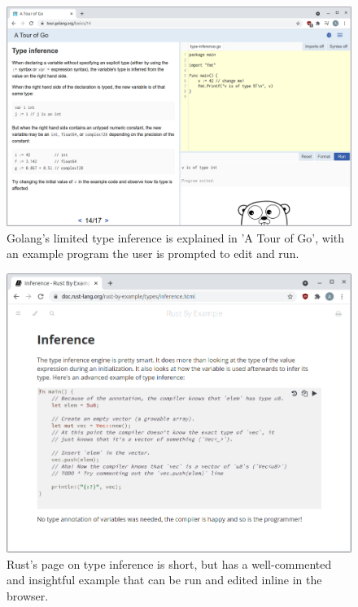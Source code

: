 \documentclass[a4paper,fleqn,oneside,12pt]{report}
\begin{document}
\begin{figure}[h!]
  \centering
  \includegraphics[width=1.000\linewidth]{images/image5.png}
  \caption{Golang's limited type inference is explained in 'A Tour of Go', with an example program the user is prompted to edit and run.}
\end{figure}

\begin{figure}[h!]
  \centering
  \includegraphics[width=1.000\linewidth]{images/image24.png}
  \caption{Rust's page on type inference is short, but has a well-commented and insightful example that can be run and edited inline in the browser.}
\end{figure}
\end{document}
